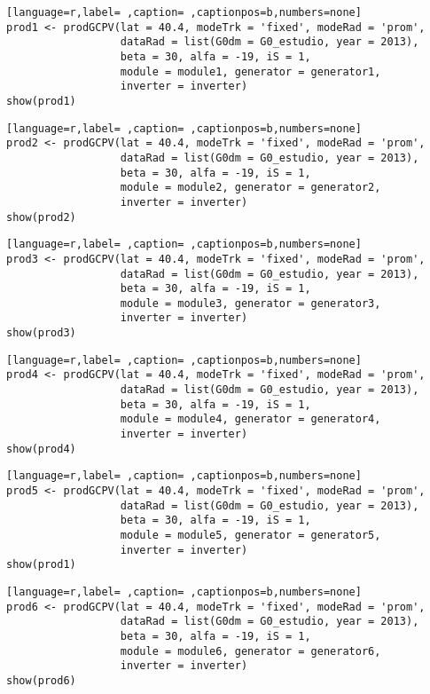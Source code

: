 \begin{lstlisting}[language=r,label= ,caption= ,captionpos=b,numbers=none]
prod1 <- prodGCPV(lat = 40.4, modeTrk = 'fixed', modeRad = 'prom',
                  dataRad = list(G0dm = G0_estudio, year = 2013),
                  beta = 30, alfa = -19, iS = 1,
                  module = module1, generator = generator1,
                  inverter = inverter)
show(prod1)
\end{lstlisting}
\begin{lstlisting}[language=r,label= ,caption= ,captionpos=b,numbers=none]
prod2 <- prodGCPV(lat = 40.4, modeTrk = 'fixed', modeRad = 'prom',
                  dataRad = list(G0dm = G0_estudio, year = 2013),
                  beta = 30, alfa = -19, iS = 1,
                  module = module2, generator = generator2,
                  inverter = inverter)
show(prod2)
\end{lstlisting}
\begin{lstlisting}[language=r,label= ,caption= ,captionpos=b,numbers=none]
prod3 <- prodGCPV(lat = 40.4, modeTrk = 'fixed', modeRad = 'prom',
                  dataRad = list(G0dm = G0_estudio, year = 2013),
                  beta = 30, alfa = -19, iS = 1,
                  module = module3, generator = generator3,
                  inverter = inverter)
show(prod3)
\end{lstlisting}
\begin{lstlisting}[language=r,label= ,caption= ,captionpos=b,numbers=none]
prod4 <- prodGCPV(lat = 40.4, modeTrk = 'fixed', modeRad = 'prom',
                  dataRad = list(G0dm = G0_estudio, year = 2013),
                  beta = 30, alfa = -19, iS = 1,
                  module = module4, generator = generator4,
                  inverter = inverter)
show(prod4)
\end{lstlisting}
\begin{lstlisting}[language=r,label= ,caption= ,captionpos=b,numbers=none]
prod5 <- prodGCPV(lat = 40.4, modeTrk = 'fixed', modeRad = 'prom',
                  dataRad = list(G0dm = G0_estudio, year = 2013),
                  beta = 30, alfa = -19, iS = 1,
                  module = module5, generator = generator5,
                  inverter = inverter)
show(prod1)
\end{lstlisting}
\begin{lstlisting}[language=r,label= ,caption= ,captionpos=b,numbers=none]
prod6 <- prodGCPV(lat = 40.4, modeTrk = 'fixed', modeRad = 'prom',
                  dataRad = list(G0dm = G0_estudio, year = 2013),
                  beta = 30, alfa = -19, iS = 1,
                  module = module6, generator = generator6,
                  inverter = inverter)
show(prod6)
\end{lstlisting}
